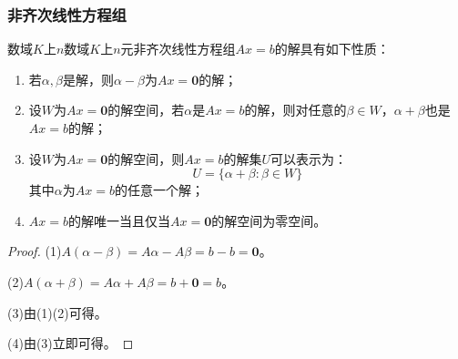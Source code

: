 \subsubsection{非齐次线性方程组}
\begin{property}\label{prop:InhomogeneousSLESolution}
	数域$K$上$n$数域$K$上$n$元非齐次线性方程组$Ax=b$的解具有如下性质：
	\begin{enumerate}
		\item 若$\alpha,\beta$是解，则$\alpha-\beta$为$Ax=\mathbf{0}$的解；
		\item 设$W$为$Ax=\mathbf{0}$的解空间，若$\alpha$是$Ax=b$的解，则对任意的$\beta\in W$，$\alpha+\beta$也是$Ax=b$的解；
		\item 设$W$为$Ax=\mathbf{0}$的解空间，则$Ax=b$的解集$U$可以表示为：
		\begin{equation*}
			U=\{\alpha+\beta:\beta\in W\}
		\end{equation*}
		其中$\alpha$为$Ax=b$的任意一个解；
		\item $Ax=b$的解唯一当且仅当$Ax=\mathbf{0}$的解空间为零空间。
	\end{enumerate}
\end{property}
\begin{proof}
	(1)$A(\alpha-\beta)=A\alpha-A\beta=b-b=\mathbf{0}$。\par
	(2)$A(\alpha+\beta)=A\alpha+A\beta=b+\mathbf{0}=b$。\par
	(3)由(1)(2)可得。\par
	(4)由(3)立即可得。
\end{proof}